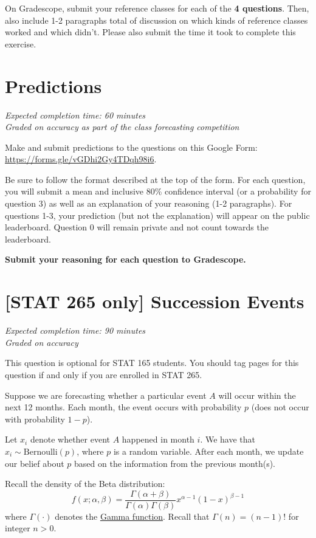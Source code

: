 \documentclass[11pt]{article}
\begin{document}
On Gradescope, submit your reference classes for each of the \textbf{4 questions}. Then, also include 1-2 paragraphs total of discussion on which kinds of reference classes worked and which didn't. Please also submit the time it took to complete this exercise.

\section*{Predictions} 

\emph{Expected completion time: 60 minutes} \\
\emph{Graded on accuracy as part of the class forecasting competition}

Make and submit predictions to the questions on this Google Form: \\ \url{https://forms.gle/vGDhi2Gy4TDqh98i6}.

Be sure to follow the format
described at the top of the form.
For each question, you will submit a mean and inclusive 80\% confidence interval (or a probability
for question 3) as well as an explanation of your reasoning (1-2 paragraphs).
For questions 1-3, your prediction (but not the explanation) will appear on the public leaderboard.
Question 0 will remain private and not count towards the leaderboard.

\textbf{Submit your reasoning for each question to Gradescope.}


\newpage
\section*{[STAT 265 only] Succession Events}
\emph{Expected completion time: 90 minutes} \\
\emph{Graded on accuracy}

This question is optional for STAT 165 students. You should tag pages for this question if and only if you are enrolled in STAT 265.

Suppose we are forecasting whether a particular event $A$ will occur within the next 12 months. Each month, the event occurs with probability $p$ (does not occur with probability $1-p$).

Let $x_i$ denote whether event $A$ happened in month $i$. We have that $x_i \sim \text{Bernoulli}(p)$, where $p$ is a random variable. After each month, we update our belief about $p$ based on the information from the previous month(s).

Recall the density of the Beta distribution:
$$
f(x; \alpha, \beta)=\frac{\Gamma(\alpha+\beta)}{\Gamma(\alpha) \Gamma(\beta)} x^{\alpha-1}(1-x)^{\beta-1}
$$ where $\Gamma(\cdot)$ denotes the \href{https://en.wikipedia.org/wiki/Gamma_function}{Gamma function}. Recall that $\Gamma(n) = (n-1)!$ for integer $n>0$.
\end{document}
